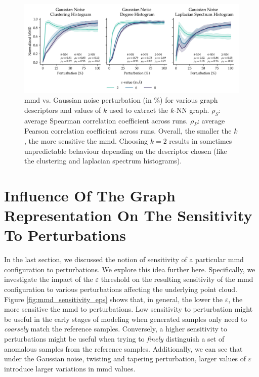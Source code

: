 \begin{figure}[!htbp]
  \includegraphics[width=\textwidth]{./figures/results/res_1_4.pdf}
  \caption[Influence of $k$ on the resulting \acrshort{mmd} values.]{\acrshort{mmd} vs. Gaussian noise
perturbation (in \%) for various graph descriptors and values of $k$ used to
extract the $k$-NN graph. $\rho_{S}$: average Spearman correlation
coefficient across runs. $\rho_{P}$: average Pearson correlation coefficient
across runs. Overall, the smaller the $k$, the more sensitive the
\acrshort{mmd}. Choosing $k=2$ results in sometimes unpredictable behaviour depending on
the descriptor chosen (like the clustering and laplacian spectrum histograms).}
  \label{fig:k_vs_turbulence_gaussian_noise}

\end{figure}


\section{Influence Of The Graph Representation On The Sensitivity To Perturbations}\label{sec:results_sensitivity}

In the last section, we discussed the notion of sensitivity of a particular \acrshort{mmd}
configuration to perturbations. We explore this idea further here. Specifically,
we investigate the impact of the $\varepsilon$ threshold on the resulting
sensitivity of the \acrshort{mmd} configuration to various perturbations affecting the
underlying point cloud. Figure \ref{fig:mmd_sensitivity_eps} shows that, in
general, the lower the $\varepsilon$, the more sensitive the \acrshort{mmd} to
perturbations. Low sensitivity to perturbation might be useful in the early
stages of modeling when generated samples only need to \emph{coarsely} match
the reference samples. Conversely, a higher sensitivity to perturbations might
be useful when trying to \emph{finely} distinguish a set of anomalous samples
from the reference samples. Additionally, we can see that under the Gaussian
noise, twisting and tapering perturbation, larger values of $\varepsilon$
introduce larger variations in \acrshort{mmd} values.

